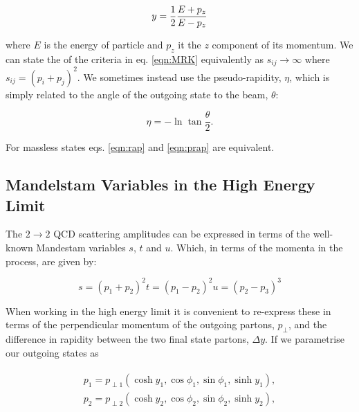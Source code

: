 		\begin{equation}
			y = \frac{1}{2}\frac{E+p_z}{E-p_z}
			\label{eqn:rap}
		\end{equation}

		where $E$ is the energy of particle and $p_z$ it the $z$ component of its momentum. We can
		state the of the criteria in eq. \eqref{eqn:MRK} equivalently as $s_{ij}\rightarrow\infty$ where
		$s_{ij} = (p_i + p_j)^2$.  We sometimes instead use the pseudo-rapidity, $\eta$, which is
		simply related to the angle of the outgoing state to the beam, $\theta$:

		\begin{equation}
			\eta = -\ln\tan\frac{\theta}{2}.
			\label{eqn:prap}
		\end{equation}

		For massless states eqs. \eqref{eqn:rap} and \eqref{eqn:prap} are equivalent.

	\subsection{Mandelstam Variables in the High Energy Limit}
		\label{sub:MandelstamVariables}

		The $2\rightarrow 2$ QCD scattering amplitudes can be expressed in terms of the well-known Mandestam
		variables $s$, $t$ and $u$.  Which, in terms of the momenta in the process, are given by:

		\begin{subequations}
			\begin{equation}
				s = (p_1 + p_2)^2
			\end{equation}
			\begin{equation}
				t = (p_1 - p_2)^2
			\end{equation}
			\begin{equation}
				u = (p_2 - p_3)^3
			\end{equation}
			\label{eqn:mandel}
		\end{subequations}

		When working in the high energy limit it is convenient to re-express these in terms of the
		perpendicular momentum of the outgoing partons, $p_\perp$, and the difference in rapidity
		between the two final state partons, $\Delta y$.  If we parametrise our outgoing states as

		\begin{align}
		\begin{split}
			p_1 = p_{\perp1}(\cosh y_1, \cos\phi_1, \sin\phi_1, \sinh y_1),\\
			p_2 = p_{\perp2}(\cosh y_2, \cos\phi_2, \sin\phi_2, \sinh y_2),
		\end{split}
		\end{align}

